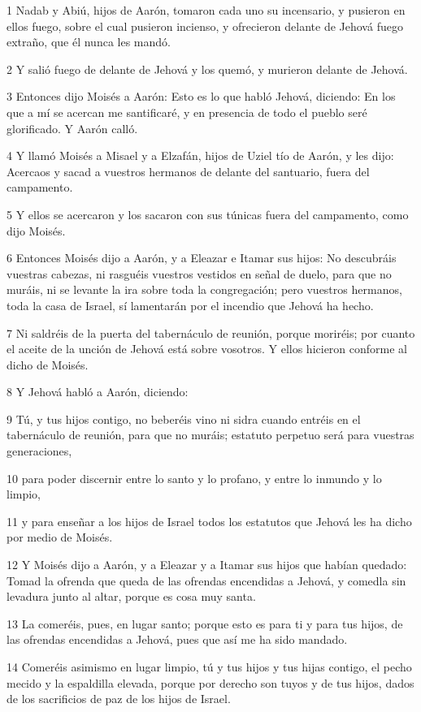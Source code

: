 \par 1 Nadab y Abiú, hijos de Aarón, tomaron cada uno su incensario, y pusieron en ellos fuego, sobre el cual pusieron incienso, y ofrecieron delante de Jehová fuego extraño, que él nunca les mandó.
\par 2 Y salió fuego de delante de Jehová y los quemó, y murieron delante de Jehová.
\par 3 Entonces dijo Moisés a Aarón: Esto es lo que habló Jehová, diciendo: En los que a mí se acercan me santificaré, y en presencia de todo el pueblo seré glorificado. Y Aarón calló.
\par 4 Y llamó Moisés a Misael y a Elzafán, hijos de Uziel tío de Aarón, y les dijo: Acercaos y sacad a vuestros hermanos de delante del santuario, fuera del campamento.
\par 5 Y ellos se acercaron y los sacaron con sus túnicas fuera del campamento, como dijo Moisés.
\par 6 Entonces Moisés dijo a Aarón, y a Eleazar e Itamar sus hijos: No descubráis vuestras cabezas, ni rasguéis vuestros vestidos en señal de duelo, para que no muráis, ni se levante la ira sobre toda la congregación; pero vuestros hermanos, toda la casa de Israel, sí lamentarán por el incendio que Jehová ha hecho.
\par 7 Ni saldréis de la puerta del tabernáculo de reunión, porque moriréis; por cuanto el aceite de la unción de Jehová está sobre vosotros. Y ellos hicieron conforme al dicho de Moisés.
\par 8 Y Jehová habló a Aarón, diciendo:
\par 9 Tú, y tus hijos contigo, no beberéis vino ni sidra cuando entréis en el tabernáculo de reunión, para que no muráis; estatuto perpetuo será para vuestras generaciones,
\par 10 para poder discernir entre lo santo y lo profano, y entre lo inmundo y lo limpio,
\par 11 y para enseñar a los hijos de Israel todos los estatutos que Jehová les ha dicho por medio de Moisés.
\par 12 Y Moisés dijo a Aarón, y a Eleazar y a Itamar sus hijos que habían quedado: Tomad la ofrenda que queda de las ofrendas encendidas a Jehová, y comedla sin levadura junto al altar, porque es cosa muy santa.
\par 13 La comeréis, pues, en lugar santo; porque esto es para ti y para tus hijos, de las ofrendas encendidas a Jehová, pues que así me ha sido mandado.
\par 14 Comeréis asimismo en lugar limpio, tú y tus hijos y tus hijas contigo, el pecho mecido y la espaldilla elevada, porque por derecho son tuyos y de tus hijos, dados de los sacrificios de paz de los hijos de Israel.
